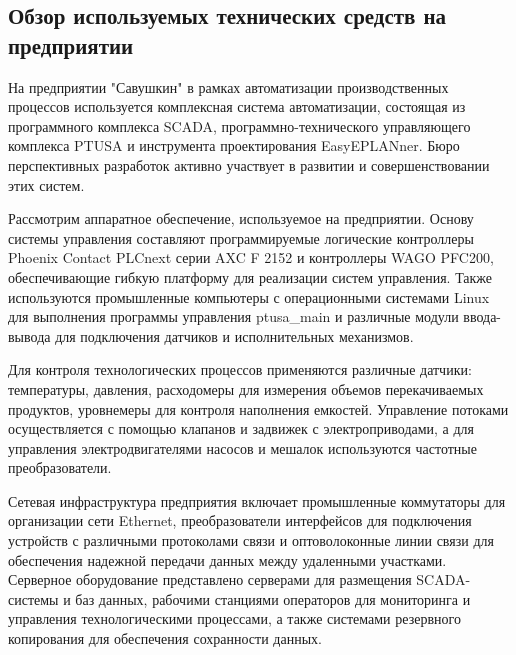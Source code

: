 \subtitlespace

\subsection*{
  \gostTitleFont
   Обзор используемых технических средств на предприятии
} 

\subtitlespace

{\gostFont

  \par \redline На предприятии "Савушкин" в рамках автоматизации производственных процессов используется комплексная система автоматизации, состоящая из программного комплекса SCADA, программно-технического управляющего комплекса PTUSA и инструмента проектирования EasyEPLANner. Бюро перспективных разработок активно участвует в развитии и совершенствовании этих систем.

  \par \redline Рассмотрим аппаратное обеспечение, используемое на предприятии. Основу системы управления составляют программируемые логические контроллеры Phoenix Contact PLCnext серии AXC F 2152 и контроллеры WAGO PFC200, обеспечивающие гибкую платформу для реализации систем управления. Также используются промышленные компьютеры с операционными системами Linux для выполнения программы управления ptusa\_main и различные модули ввода-вывода для подключения датчиков и исполнительных механизмов.

  \par \redline Для контроля технологических процессов применяются различные датчики: температуры, давления, расходомеры для измерения объемов перекачиваемых продуктов, уровнемеры для контроля наполнения емкостей. Управление потоками осуществляется с помощью клапанов и задвижек с электроприводами, а для управления электродвигателями насосов и мешалок используются частотные преобразователи.

  \par \redline Сетевая инфраструктура предприятия включает промышленные коммутаторы для организации сети Ethernet, преобразователи интерфейсов для подключения устройств с различными протоколами связи и оптоволоконные линии связи для обеспечения надежной передачи данных между удаленными участками. Серверное оборудование представлено серверами для размещения SCADA-системы и баз данных, рабочими станциями операторов для мониторинга и управления технологическими процессами, а также системами резервного копирования для обеспечения сохранности данных.

}
